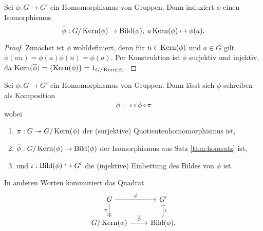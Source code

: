 \documentclass{book}
\begin{document}
\begin{thm}[Homomorphiesatz]
    \label{thm:homsatz} 
    Sei $\phi: G \to G'$ ein Homomorphismus von Gruppen. Dann induziert $\phi$ einen Isomorphismus 
    \[
        \overline{\phi}: G / \Kern(\phi) \to \Bild(\phi),\; a \Kern(\phi) \mapsto \phi(a).
    \]
\end{thm}
\begin{proof}
    Zunächst ist $\overline{\phi}$ wohldefiniert, denn für $n \in \Kern(\phi)$
    und $a \in G$ gilt $\phi(an) = \phi(a) \phi(n) = \phi(a)$. Per Konstruktion
    ist $\overline{\phi}$ surjektiv und injektiv, da $\Kern(\overline{\phi}) =
    \{\Kern(\phi)\} = 1_{G/\Kern(\phi)}$. 
\end{proof}

\begin{cor}
    \label{cor:homsatz} Sei $\phi: G \to G'$ ein Homomorphismus von Gruppen. Dann lässt sich $\phi$ schreiben als Komposition
    \[
        \phi = \iota \circ \overline{\phi} \circ \pi
    \]
    wobei 
    \begin{enumerate}[label=\arabic*.]
        \item $\pi: G \twoheadrightarrow G/ \Kern(\phi)$ der (surjektive) Quotientenhomomorphismus ist,
        \item $\overline{\phi}: G/ \Kern(\phi) \to \Bild(\phi)$ der Isomorphismus aus Satz \ref{thm:homsatz} ist, 
        \item und $\iota: \Bild(\phi) \hra G'$ die (injektive) Einbettung des Bildes von $\phi$ ist.
    \end{enumerate}
    In anderen Worten kommutiert das Quadrat
    \[
    \begin{tikzcd}
        G \ar{r}{\phi}\ar[->>,swap]{d}{\pi} & G'\\
        G/\Kern(\phi) \ar{r}{\overline{\phi}} & \Bild(\phi) \ar[hook,swap]{u}{\iota}.
    \end{tikzcd}
    \]
\end{cor}
\end{document}
